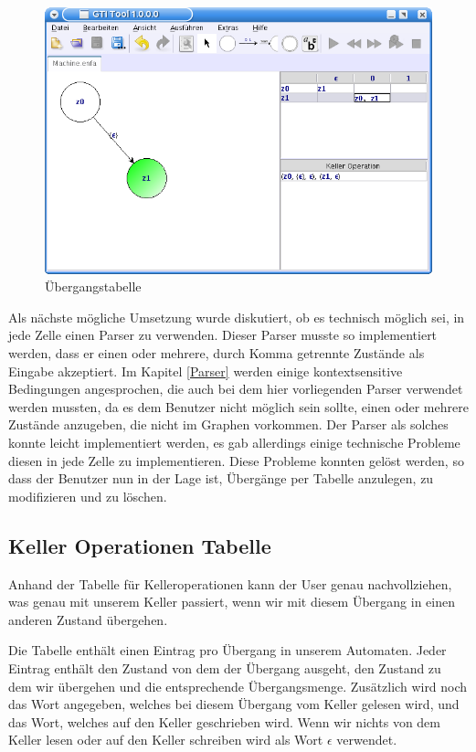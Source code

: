 \begin{figure}[h!]
\begin{center}
\includegraphics[width=12cm]{../images/machine_table.png}
\caption{Übergangstabelle}
\end{center}
\end{figure}

Als nächste mögliche Umsetzung wurde diskutiert, ob es technisch möglich sei,
in jede Zelle einen Parser zu verwenden. Dieser Parser musste so implementiert
werden, dass er einen oder mehrere, durch Komma getrennte Zustände als Eingabe
akzeptiert. Im Kapitel \ref{Parser} werden einige kontextsensitive Bedingungen
angesprochen, die auch bei dem hier vorliegenden Parser verwendet werden
mussten, da es dem Benutzer nicht möglich sein sollte, einen oder mehrere
Zustände anzugeben, die nicht im Graphen vorkommen. Der Parser als solches
konnte leicht implementiert werden, es gab allerdings einige technische
Probleme diesen in jede Zelle zu implementieren. Diese Probleme konnten gelöst
werden, so dass der Benutzer nun in der Lage ist, Übergänge per Tabelle
anzulegen, zu modifizieren und zu löschen.


\subsection{Keller Operationen Tabelle}

Anhand der Tabelle für Kelleroperationen kann der User genau nachvollziehen,
was genau mit unserem Keller passiert, wenn wir mit diesem
Übergang in einen anderen Zustand übergehen.\vspace{10pt}

Die Tabelle enthält einen Eintrag pro Übergang in unserem Automaten. Jeder
Eintrag enthält den Zustand von dem der Übergang ausgeht, den Zustand zu dem
wir übergehen und die entsprechende Übergangsmenge. Zusätzlich wird noch
das Wort angegeben, welches bei diesem Übergang vom Keller gelesen wird, und
das Wort, welches auf den Keller geschrieben wird. Wenn wir nichts von dem
Keller lesen oder auf den Keller schreiben wird als Wort $\epsilon$
verwendet.\vspace{10pt}

